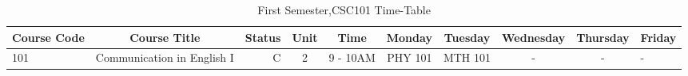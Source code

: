 \documentclass{article}
\begin{document}
 
	\begin{sidewaystable}[h!] 
		\begin{center}
		 \caption{First Semester,CSC101 Time-Table}
		 \label{tab:tablel} 
		 	\begin{tabular}{l|c|r|c|c|c|c|c|c|l} 
		 	\textbf{Course Code} & \textbf{Course Title} & \textbf{Status} & \textbf{Unit} & \textbf{Time} & \textbf{Monday} & \textbf{Tuesday} & \textbf{Wednesday} & \textbf{Thursday} & \textbf{Friday}\\ \hline 
		 	 101 & Communication in English I& C & 2 & 9 - 10AM & PHY 101 & MTH 101 & - & - & - 
			\end{tabular} 
		\end{center} 
	\end{sidewaystable} 
\end{document}
